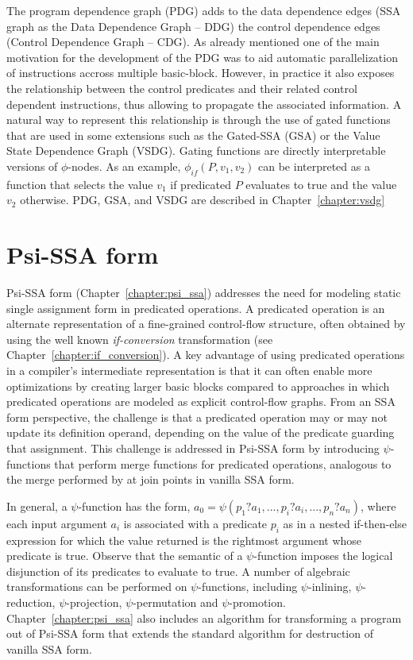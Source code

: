 The program dependence graph (PDG) adds to the data dependence edges (SSA graph as the Data Dependence Graph -- DDG) the control dependence edges (Control Dependence Graph -- CDG).
As already mentioned one of the main motivation for the development of the PDG was to aid automatic parallelization of instructions accross multiple basic-block.
However, in practice it also exposes the relationship between the control predicates and their related control dependent instructions, thus allowing to propagate the associated information.
A natural way to represent this relationship is through the use of gated functions that are used in some extensions such as the Gated-SSA (GSA) or the Value State Dependence Graph (VSDG).
Gating functions are directly interpretable versions of $\phi$-nodes.
As an example, $\phi_\textit{if}(P, v_1, v_2)$ can be interpreted as a function that selects the value $v_1$ if predicated $P$ evaluates to true and the value $v_2$ otherwise.
PDG, GSA, and VSDG are described in Chapter~\ref{chapter:vsdg}

\section{Psi-SSA form}

Psi-SSA form (Chapter~\ref{chapter:psi_ssa}) addresses the need for modeling static single assignment form in predicated operations. 
A predicated operation is an alternate representation of a fine-grained control-flow structure, often obtained by using the well known {\em if-conversion} transformation (see Chapter~\ref{chapter:if_conversion}). 
A key advantage of using predicated operations in a compiler's intermediate representation is that it can often enable more optimizations by creating larger basic blocks compared to approaches in which predicated operations are modeled as explicit control-flow graphs. 
From an SSA form perspective, the challenge is that a predicated operation may or may not update its definition operand, depending on the value of the predicate guarding that assignment. 
This challenge is addressed in Psi-SSA form by introducing $\psi$-functions that perform merge functions for predicated operations, analogous to the merge performed by \phifuns at join points in vanilla SSA form.

In general, a $\psi$-function has the form, $a_0 = \psi\left(p_1?a_1, ..., p_i?a_i, ..., p_n?a_n\right)$, where each input argument $a_i$ is associated with a predicate $p_i$ as in a nested if-then-else expression for which the value returned is the rightmost argument whose predicate is true. 
Observe that the semantic of a $\psi$-function imposes the logical disjunction of its predicates to evaluate to true. 
A number of algebraic transformations can be performed on $\psi$-functions, including $\psi$-inlining, $\psi$-reduction, $\psi$-projection, $\psi$-permutation and $\psi$-promotion. 
Chapter~\ref{chapter:psi_ssa} also includes an algorithm for transforming a program out of Psi-SSA form that extends the standard algorithm for destruction of vanilla SSA form. 



